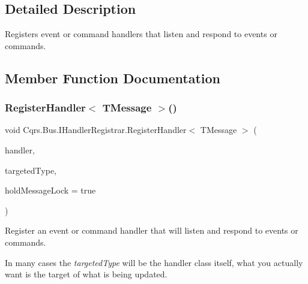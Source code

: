 \subsection{Detailed Description}
Registers event or command handlers that listen and respond to events or commands. 



\subsection{Member Function Documentation}
\mbox{\label{interfaceCqrs_1_1Bus_1_1IHandlerRegistrar_ab6ca4dfdc54a5aeebe4651dbdb479f55_ab6ca4dfdc54a5aeebe4651dbdb479f55}} 
\subsubsection{\texorpdfstring{Register\+Handler$<$ T\+Message $>$()}{RegisterHandler< TMessage >()}\hspace{0.1cm}{\footnotesize\ttfamily [1/2]}}
{\footnotesize\ttfamily void Cqrs.\+Bus.\+I\+Handler\+Registrar.\+Register\+Handler$<$ T\+Message $>$ (\begin{DoxyParamCaption}\item[{Action$<$ T\+Message $>$}]{handler,  }\item[{Type}]{targeted\+Type,  }\item[{bool}]{hold\+Message\+Lock = {\ttfamily true} }\end{DoxyParamCaption})}



Register an event or command handler that will listen and respond to events or commands. 

In many cases the {\itshape targeted\+Type}  will be the handler class itself, what you actually want is the target of what is being updated. 

